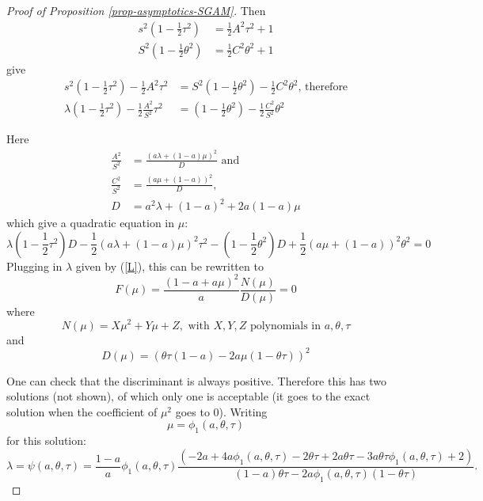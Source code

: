 \documentclass[
  12pt,
]{article}
\theoremstyle{definition}
\theoremstyle{definition}
\theoremstyle{definition}
\theoremstyle{definition}
\theoremstyle{remark}
\begin{document}
\begin{proof}[Proof of Proposition \ref{prop-asymptotics-SGAM}]
Then
\begin{align*}
s^{2}\left(1-\frac{1}{2}\tau^{2}\right) & =\frac{1}{2}A^{2}\tau^{2}+1\\
S^{2}\left(1-\frac{1}{2}\theta^{2}\right) & =\frac{1}{2}C^{2}\theta^{2}+1
\end{align*}
give
\begin{align*}
s^{2}\left(1-\frac{1}{2}\tau^{2}\right)-\frac{1}{2}A^{2}\tau^{2} & =S^{2}\left(1-\frac{1}{2}\theta^{2}\right)-\frac{1}{2}C^{2}\theta^{2}\text{, therefore}\\
\lambda\left(1-\frac{1}{2}\tau^{2}\right)-\frac{1}{2}\frac{A^{2}}{S^{2}}\tau^{2} & =\left(1-\frac{1}{2}\theta^{2}\right)-\frac{1}{2}\frac{C^{2}}{S^{2}}\theta^{2}
\end{align*}

Here
\begin{align*}
\frac{A^{2}}{S^{2}} & =\frac{\left(a\lambda+\left(1-a\right)\mu\right)^{2}}{D}\text{ \ and}\\
\frac{C^{2}}{S^{2}} & =\frac{\left(a\mu+\left(1-a\right)\right)^{2}}{D},\\
D & =a^{2}\lambda+\left(1-a\right)^{2}+2a\left(1-a\right)\mu
\end{align*}
which give a quadratic equation in $\mu$:
\[
\lambda\left(1-\frac{1}{2}\tau^{2}\right)D-\frac{1}{2}\left(a\lambda+\left(1-a\right)\mu\right)^{2}\tau^{2}-\left(1-\frac{1}{2}\theta^{2}\right)D+\frac{1}{2}\left(a\mu+\left(1-a\right)\right)^{2}\theta^{2}=0
\]
Plugging in $\lambda$ given by (\ref{L}), this can be rewritten
to
\[
F\left(\mu\right)=\frac{\left(1-a+a\mu\right)^{2}}{a}\frac{N\left(\mu\right)}{D\left(\mu\right)}=0
\]
where
\[
N\left(\mu\right)=X\mu^{2}+Y\mu+Z,\textrm{ with }X,Y,Z\textrm{ polynomials in }a,\theta,\tau
\]
and
\[
D\left(\mu\right)=\left(\theta\tau\left(1-a\right)-2a\mu\left(1-\theta\tau\right)\right)^{2}
\]

One can check that the discriminant is always positive. Therefore
this has two solutions (not shown), of which only one is acceptable
(it goes to the exact solution when the coefficient of $\mu^{2}$
goes to 0). Writing 
\[
\mu=\phi_{1}(a,\theta,\tau)
\]
 for this solution:
\[
\lambda=\psi\left(a,\theta,\tau\right)=\frac{1-a}{a}\phi_{1}\left(a,\theta,\tau\right)\allowbreak\frac{\left(-2a+4a\phi_{1}\left(a,\theta,\tau\right)-2\theta\tau+2a\theta\tau-3a\theta\tau\phi_{1}\left(a,\theta,\tau\right)+2\right)}{\left(1-a\right)\theta\tau-2a\phi_{1}\left(a,\theta,\tau\right)\left(1-\theta\tau\right)}.
\]


\end{proof}
\end{document}
